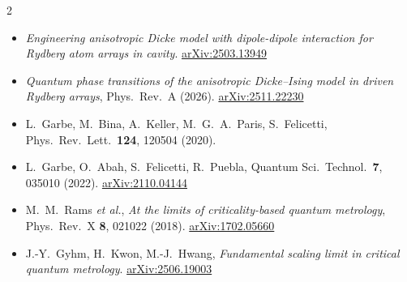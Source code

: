 \documentclass[10pt,a4paper,landscape]{article}
\begin{document}
{\begin{multicols}{2}
\begin{itemize}[leftmargin=1.1em,itemsep=0pt,parsep=0pt,label={}]
{      superradiant solid}, Phys.~Rev.~Lett.~\textbf{110}, 090402 (2013).
      \href{https://arxiv.org/abs/1207.4238}{arXiv:1207.4238}
\item \emph{Engineering anisotropic Dicke model with dipole-dipole interaction for Rydberg atom arrays in
      cavity}. \href{https://arxiv.org/abs/2503.13949}{arXiv:2503.13949}
\item \emph{Quantum phase transitions of the anisotropic Dicke--Ising model in driven Rydberg arrays},
      Phys.~Rev.~A (2026). \href{https://arxiv.org/abs/2511.22230}{arXiv:2511.22230}
\item L.~Garbe, M.~Bina, A.~Keller, M.~G.~A.~Paris, S.~Felicetti, Phys.~Rev.~Lett.~\textbf{124}, 120504 (2020).
\item L.~Garbe, O.~Abah, S.~Felicetti, R.~Puebla, Quantum Sci.~Technol.~\textbf{7}, 035010 (2022).
      \href{https://arxiv.org/abs/2110.04144}{arXiv:2110.04144}
\item M.~M.~Rams \emph{et al.}, \emph{At the limits of criticality-based quantum metrology}, Phys.~Rev.~X
      \textbf{8}, 021022 (2018). \href{https://arxiv.org/abs/1702.05660}{arXiv:1702.05660}
\item J.-Y.~Gyhm, H.~Kwon, M.-J.~Hwang, \emph{Fundamental scaling limit in critical quantum metrology}.
      \href{https://arxiv.org/abs/2506.19003}{arXiv:2506.19003}
\end{itemize}
\end{multicols}}
\end{document}
